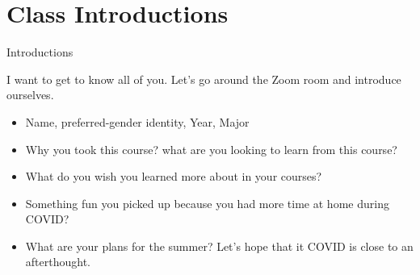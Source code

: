 \documentclass{libs/XJTLU_format}
\begin{document}
\section{Class Introductions}
\begin{frame}{Introductions}

I want to get to know all of you. Let's go around the Zoom room and introduce ourselves.

\begin{itemize}
    \item Name, preferred-gender identity,  Year, Major
    \item Why you took this course? what are you looking to learn from this course? 
    \item What do you wish you learned more about in your courses?
    \item Something fun you picked up because you had more time at home during COVID?
    \item What are your plans for the summer? Let's hope that it COVID is close to an afterthought. 
\end{itemize}

\end{frame}
    



    

\end{document}
